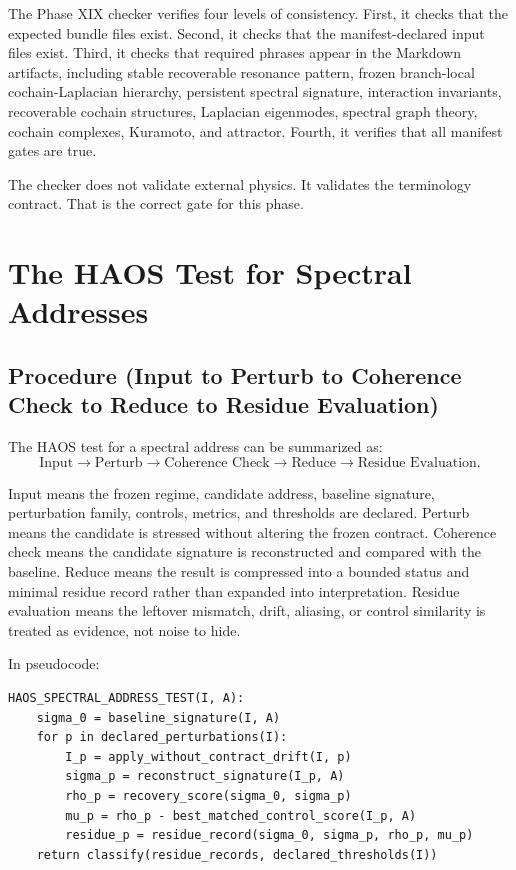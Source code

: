 \documentclass[11pt]{article}
\begin{document}
The Phase XIX checker verifies four levels of consistency. First, it checks that the expected bundle files exist. Second, it checks that the manifest-declared input files exist. Third, it checks that required phrases appear in the Markdown artifacts, including stable recoverable resonance pattern, frozen branch-local cochain-Laplacian hierarchy, persistent spectral signature, interaction invariants, recoverable cochain structures, Laplacian eigenmodes, spectral graph theory, cochain complexes, Kuramoto, and attractor. Fourth, it verifies that all manifest gates are true.

The checker does not validate external physics. It validates the terminology contract. That is the correct gate for this phase.

\section{The HAOS Test for Spectral Addresses}

\subsection{Procedure (Input to Perturb to Coherence Check to Reduce to Residue Evaluation)}

The HAOS test for a spectral address can be summarized as:
\[
\text{Input}
\rightarrow
\text{Perturb}
\rightarrow
\text{Coherence Check}
\rightarrow
\text{Reduce}
\rightarrow
\text{Residue Evaluation}.
\]

Input means the frozen regime, candidate address, baseline signature, perturbation family, controls, metrics, and thresholds are declared. Perturb means the candidate is stressed without altering the frozen contract. Coherence check means the candidate signature is reconstructed and compared with the baseline. Reduce means the result is compressed into a bounded status and minimal residue record rather than expanded into interpretation. Residue evaluation means the leftover mismatch, drift, aliasing, or control similarity is treated as evidence, not noise to hide.

In pseudocode:

\begin{verbatim}
HAOS_SPECTRAL_ADDRESS_TEST(I, A):
    sigma_0 = baseline_signature(I, A)
    for p in declared_perturbations(I):
        I_p = apply_without_contract_drift(I, p)
        sigma_p = reconstruct_signature(I_p, A)
        rho_p = recovery_score(sigma_0, sigma_p)
        mu_p = rho_p - best_matched_control_score(I_p, A)
        residue_p = residue_record(sigma_0, sigma_p, rho_p, mu_p)
    return classify(residue_records, declared_thresholds(I))
\end{verbatim}
\end{document}
